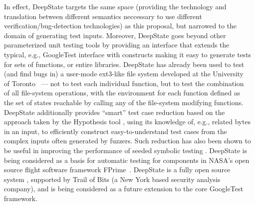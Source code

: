 In effect, DeepState targets the same space (providing the technology and translation between different semantics neccessary to use different verification/bug-detection technologies) as this proposal, but narrowed to the domain of generating test inputs.  Moreover, DeepState goes beyond other parameterized unit testing tools by providing an interface that extends the typical, e.g., GoogleTest interface with constructs making it easy to generate tests for sets of functions, or entire libraries.  DeepState has already been used to test (and find bugs in) a user-mode ext3-like file system developed at the University of Toronto~\cite{testfs,testfsrepo} --- not to test each individual function, but to test the combination of all file-system operations, with the environment for each function defined as the set of states reachable by calling any of the file-system modifying functions.  DeepState additionally provides ``smart'' test case reduction based on the approach taken by the Hypothesis tool \cite{Hypothesis}, using its knowledge of, e.g., related bytes in an input, to efficiently construct easy-to-understand test cases from the complex inputs often generated by fuzzers.  Such reduction has also been shown to be useful in improving the performance of seeded symbolic testing \cite{issta14}.
DeepState is being considered as a basis for automatic testing for components in NASA's open source flight software framework FPrime~\cite{fprime,fprimerepo}.  DeepState is a fully open source system \cite{deepstaterepo}, supported by Trail of Bits (a New York based security analysis company), and is being considered as a future extension to the core GoogleTest framework.